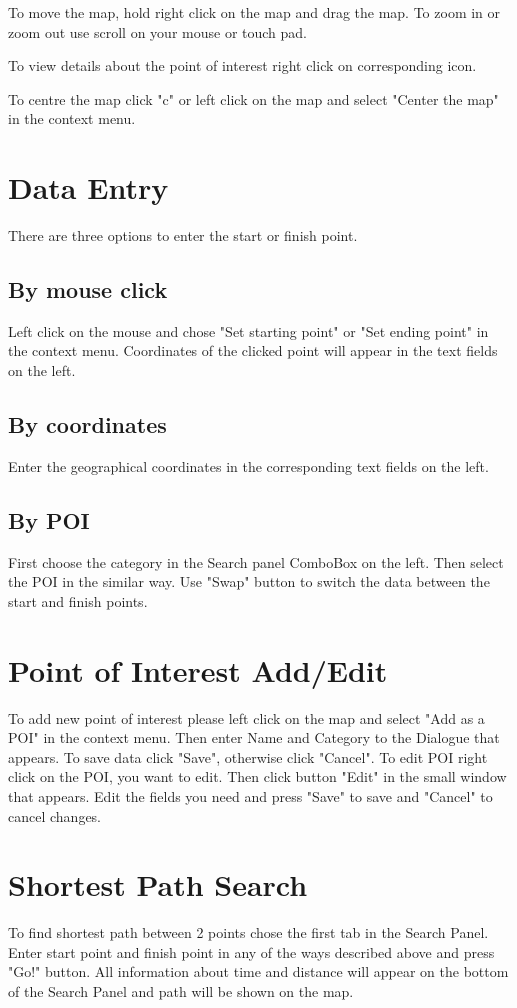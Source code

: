 	To move the map, hold right click on the map and drag the map. To zoom in or zoom out use scroll on your mouse or touch pad.
	
	To view details about the point of interest right click on corresponding icon. 
	
	To centre the map click "c" or left click on the map and select "Center the map" in the context menu.
		
\section{Data Entry}
	There are three options to enter the start or finish point.
	\subsection{By mouse click} Left click on the mouse and chose "Set starting point" or "Set ending point" in the context menu. Coordinates of the clicked point will appear in the text fields on the left.
	\subsection{By coordinates} Enter the geographical coordinates in the corresponding text fields on the left.
	\subsection{By POI} First choose the category in the Search panel ComboBox on the left. Then select the POI in the similar way.	
	Use "Swap" button to switch the data between the start and finish points.	

\section{Point of Interest Add/Edit}
	To add new point of interest please left click on the map and select "Add as a POI" in the context menu. Then enter Name and Category to the Dialogue that appears. To save data click "Save", otherwise click "Cancel". 
	To edit POI right click on the POI, you want to edit. Then click button "Edit" in the small window that appears. Edit the fields you need and press "Save" to save and "Cancel" to cancel changes.

\section{Shortest Path Search}
	To find shortest path between 2 points chose the first tab in the Search Panel. Enter start point and finish point in any of the ways described above and press "Go!" button. All information about time and distance will appear on the bottom of the Search Panel and path will be shown on the map.
	
